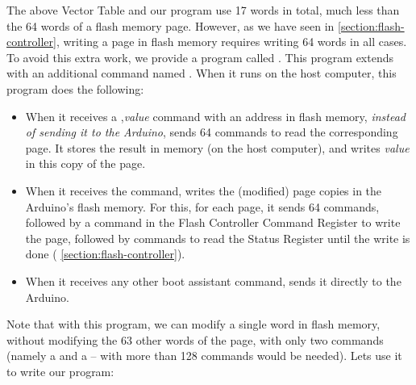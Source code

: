 The above Vector Table and our program use 17 words in total, much less than
the 64 words of a flash memory page. However, as we have seen in
\cref{section:flash-controller}, writing a page in flash memory requires
writing 64 words in all cases. To avoid this extra work, we provide a program
called . This program extends 
with an additional command named . When it runs on the host
computer, this program does the following:
\begin{itemize}
  \item When it receives a ,{\em value}\code{\#} command
  with an address in flash memory, {\em instead of sending it to the Arduino},
   sends 64  commands to read the corresponding
  page. It stores the result in memory (on the host computer), and writes {\em
  value} in this copy of the page.

  \item When it receives the  command, 
  writes the (modified) page copies in the Arduino's flash memory. For this,
  for each page, it sends 64  commands, followed by a  command
  in the Flash Controller Command Register to write the page, followed by
   commands to read the Status Register until the write is done (\cf
  \cref{section:flash-controller}).

  \item When it receives any other boot assistant command,
   sends it directly to the Arduino.
\end{itemize}

Note that with this program, we can modify a single word in flash memory,
without modifying the 63 other words of the page, with only two commands
(namely a  and a  -- with  more
than 128 commands would be needed). Lets use it to write our program:


